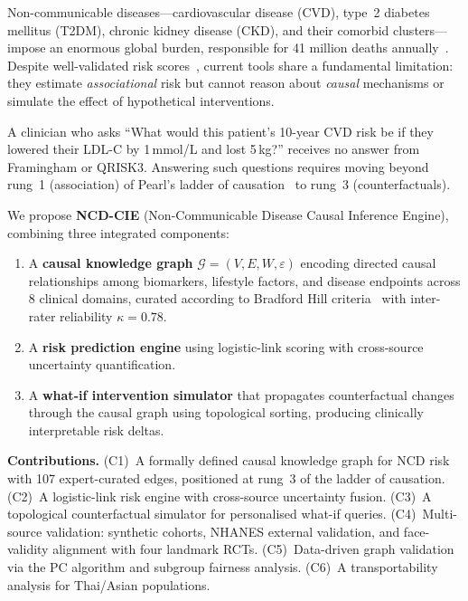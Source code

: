 \documentclass[runningheads]{llncs}
\begin{document}
Non-communicable diseases---cardiovascular disease (CVD), type~2
diabetes mellitus (T2DM), chronic kidney disease (CKD), and their
comorbid clusters---impose an enormous global burden, responsible for
41 million deaths annually~\cite{who2021ncd}.  Despite well-validated
risk scores~\cite{dagostino2008framingham, hippisley2017qrisk3,
score22021}, current tools share a fundamental limitation: they
estimate \emph{associational} risk but cannot reason about
\emph{causal} mechanisms or simulate the effect of hypothetical
interventions.

A clinician who asks ``What would this patient's 10-year CVD risk be
if they lowered their LDL-C by 1\,mmol/L and lost 5\,kg?'' receives
no answer from Framingham or QRISK3.  Answering such questions
requires moving beyond rung~1 (association) of Pearl's ladder of
causation~\cite{pearl2018book} to rung~3 (counterfactuals).

We propose \textbf{NCD-CIE} (Non-Communicable Disease Causal Inference
Engine), combining three integrated components:
\begin{enumerate}
\item A \textbf{causal knowledge graph} $\mathcal{G}=(V,E,W,\varepsilon)$
  encoding directed causal relationships among biomarkers, lifestyle
  factors, and disease endpoints across 8 clinical domains, curated
  according to Bradford Hill criteria~\cite{hill1965environment} with
  inter-rater reliability $\kappa=0.78$.
\item A \textbf{risk prediction engine} using logistic-link scoring with
  cross-source uncertainty quantification.
\item A \textbf{what-if intervention simulator} that propagates
  counterfactual changes through the causal graph using topological
  sorting, producing clinically interpretable risk deltas.
\end{enumerate}

\noindent\textbf{Contributions.}
(C1)~A formally defined causal knowledge graph for NCD risk with 107
expert-curated edges, positioned at rung~3 of the ladder of causation.
(C2)~A logistic-link risk engine with cross-source uncertainty fusion.
(C3)~A topological counterfactual simulator for personalised what-if queries.
(C4)~Multi-source validation: synthetic cohorts, NHANES external validation,
and face-validity alignment with four landmark RCTs.
(C5)~Data-driven graph validation via the PC algorithm and subgroup fairness
analysis.
(C6)~A transportability analysis for Thai/Asian populations.
\end{document}
